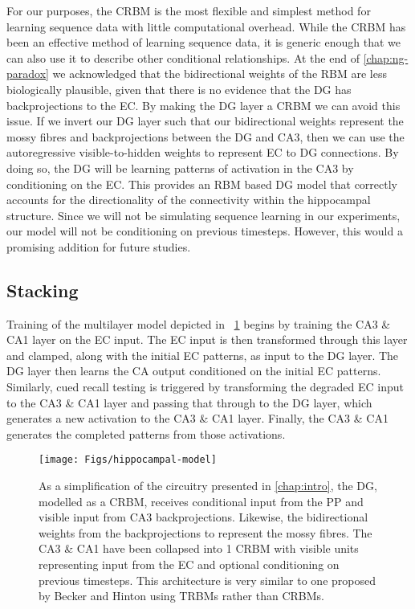 For our purposes, the \ac{CRBM} is the most flexible and simplest method for 
learning sequence data with little computational overhead. 
While the \ac{CRBM} 
has been an effective method of learning sequence data, it is generic enough 
that we can also use it to describe other conditional relationships. 
At the end of \cref{chap:ng-paradox} we acknowledged that 
the bidirectional weights of the \ac{RBM} are less biologically plausible, given that there 
is no evidence that the \ac{DG} has backprojections to the \ac{EC}. 
By making the \ac{DG} layer a \ac{CRBM} we can avoid this issue.
If we invert our \ac{DG} layer such that our bidirectional weights represent the mossy fibres and 
backprojections between the \ac{DG} and CA3, then we can use the autoregressive visible-to-hidden weights 
to represent \ac{EC} to \ac{DG} connections.
By doing so, the \ac{DG} will be learning patterns of activation in the CA3 by conditioning on the \ac{EC}.
This provides an \ac{RBM} based \ac{DG} model that 
correctly accounts for the directionality of the connectivity 
within the hippocampal structure.
Since we will not be simulating sequence learning in our experiments, our model will not 
be conditioning on previous timesteps.
However, this would a promising addition for future studies.

\subsection{Stacking}
Training of the multilayer model depicted in ~\ref{fig:hippocampal_model} 
begins by training the CA3 \& CA1 layer on the \ac{EC} input. 
The \ac{EC} input 
is then transformed through this layer and clamped, along with the initial \ac{EC} 
patterns, as input to the \ac{DG} layer. 
The \ac{DG} layer then learns the CA 
output conditioned on the initial \ac{EC} patterns. 
Similarly, cued recall  
testing is triggered by transforming the degraded \ac{EC} input to the 
CA3 \& CA1 layer and passing that through to the \ac{DG} layer, which 
generates a new activation 
to the CA3 \& CA1 layer. 
Finally, the CA3 \& CA1 generates the completed 
patterns from those activations.

\begin{figure}[!hp]
\begin{center}
\texttt{[image: Figs/hippocampal-model]}
\end{center}
\caption{
As a simplification of the circuitry presented in \cref{chap:intro}, the 
\ac{DG}, modelled as a \ac{CRBM}, 
receives conditional input from the \ac{PP} and visible input from 
CA3 backprojections. 
Likewise, the bidirectional weights from the 
backprojections to represent the mossy fibres. 
The CA3 \& CA1 have been collapsed 
into 1 \ac{CRBM} with visible units representing 
input from the \ac{EC} and optional conditioning 
on previous timesteps. 
This architecture is very similar to one proposed by Becker and Hinton 
\citeyearpar{becker-hinton-SFN-abstract} using \acp{TRBM} rather than \acp{CRBM}.
}
\label{fig:hippocampal_model}
\end{figure}

